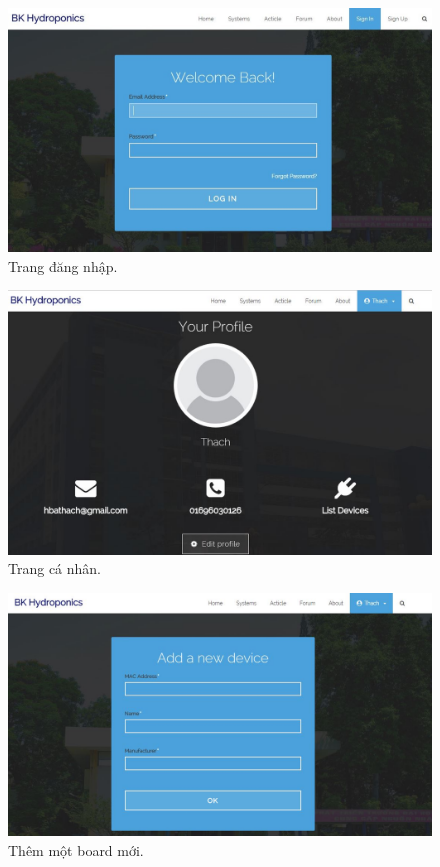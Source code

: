 \documentclass[a4paper,12pt,oneside]{article}
\begin{document}
\begin{center}
\begin{figure}[H]
\centering
\includegraphics[scale=.5]{hinh/web_login.jpg}
\caption{Trang đăng nhập.}
\end{figure}

\begin{figure}[H]
\centering
\includegraphics[scale=.5]{hinh/web_profile.jpg}
\caption{Trang cá nhân.}
\end{figure}

\begin{figure}[H]
\centering
\includegraphics[scale=.5]{hinh/web_add_device.jpg}
\caption{Thêm một board mới.}
\end{figure}


\end{center}
\end{document}
